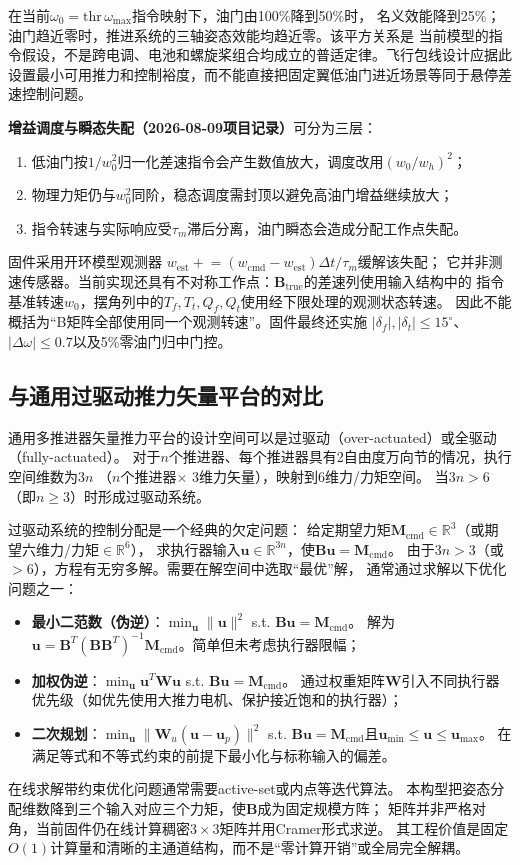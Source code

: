 在当前$\omega_0=\mathrm{thr}\,\omega_{\max}$指令映射下，油门由100\%降到50\%时，
名义效能降到25\%；油门趋近零时，推进系统的三轴姿态效能均趋近零。该平方关系是
当前模型的指令假设，不是跨电调、电池和螺旋桨组合均成立的普适定律。飞行包线设计应据此
设置最小可用推力和控制裕度，而不能直接把固定翼低油门进近场景等同于悬停差速控制问题。

\textbf{增益调度与瞬态失配（2026-08-09项目记录）}可分为三层：
\begin{enumerate}[label=(\arabic*)]
    \item 低油门按$1/w_0^2$归一化差速指令会产生数值放大，调度改用$(w_0/w_h)^2$；
    \item 物理力矩仍与$w_0^2$同阶，稳态调度需封顶以避免高油门增益继续放大；
    \item 指令转速与实际响应受$\tau_m$滞后分离，油门瞬态会造成分配工作点失配。
\end{enumerate}
固件采用开环模型观测器
$w_{\mathrm{est}}\mathrel{+}=(w_{\mathrm{cmd}}-w_{\mathrm{est}})\Delta t/\tau_m$缓解该失配；
它并非测速传感器。当前实现还具有不对称工作点：$\bm B_{\mathrm{true}}$的差速列使用输入结构中的
指令基准转速$w_0$，摆角列中的$T_f,T_t,Q_f,Q_t$使用经下限处理的观测状态转速。
因此不能概括为“B矩阵全部使用同一个观测转速”。固件最终还实施
$|\delta_f|,|\delta_t|\le15^\circ$、$|\Delta\omega|\le0.7$以及5\%零油门归中门控。

\subsection{与通用过驱动推力矢量平台的对比}

通用多推进器矢量推力平台的设计空间可以是过驱动（over-actuated）或全驱动（fully-actuated）。
对于$n$个推进器、每个推进器具有2自由度万向节的情况，执行空间维数为$3n$
（$n$个推进器$\times$ 3维力矢量），映射到6维力/力矩空间。
当$3n > 6$（即$n \ge 3$）时形成过驱动系统\cite{ding2018modeling}。

过驱动系统的控制分配是一个经典的欠定问题：
给定期望力矩$\bm{M}_{\text{cmd}} \in \mathbb{R}^3$（或期望六维力/力矩$\in \mathbb{R}^6$），
求执行器输入$\bm{u} \in \mathbb{R}^{3n}$，使$\bm{B}\bm{u} = \bm{M}_{\text{cmd}}$。
由于$3n > 3$（或$>6$），方程有无穷多解。需要在解空间中选取“最优”解，
通常通过求解以下优化问题之一\cite{johansen2013control}：
\begin{itemize}
    \item \textbf{最小二范数（伪逆）}：$\min_{\bm{u}} \|\bm{u}\|^2$ s.t. $\bm{B}\bm{u} = \bm{M}_{\text{cmd}}$。
          解为$\bm{u} = \bm{B}^T(\bm{B}\bm{B}^T)^{-1}\bm{M}_{\text{cmd}}$。简单但未考虑执行器限幅；
    \item \textbf{加权伪逆}：$\min_{\bm{u}} \bm{u}^T\bm{W}\bm{u}$ s.t. $\bm{B}\bm{u} = \bm{M}_{\text{cmd}}$。
          通过权重矩阵$\bm{W}$引入不同执行器优先级（如优先使用大推力电机、保护接近饱和的执行器）；
    \item \textbf{二次规划}：$\min_{\bm{u}} \|\bm{W}_u(\bm{u} - \bm{u}_p)\|^2$ s.t.
          $\bm{B}\bm{u} = \bm{M}_{\text{cmd}}$且$\bm{u}_{\min} \le \bm{u} \le \bm{u}_{\max}$。
          在满足等式和不等式约束的前提下最小化与标称输入的偏差。
\end{itemize}

\sloppy
在线求解带约束优化问题通常需要active-set或内点等迭代算法。
本构型把姿态分配维数降到三个输入对应三个力矩，使$\bm B$成为固定规模方阵；
矩阵并非严格对角，当前固件仍在线计算稠密$3\times3$矩阵并用Cramer形式求逆。
其工程价值是固定$O(1)$计算量和清晰的主通道结构，而不是“零计算开销”或全局完全解耦。
\fussy
